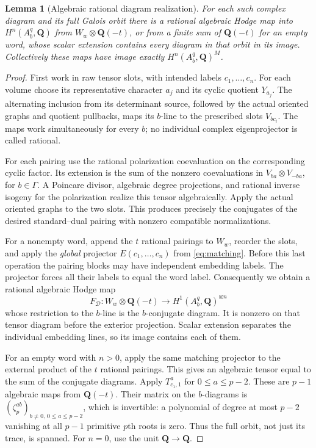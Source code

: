 \documentclass[11pt]{article}
\newtheorem{lemma}[theorem]{Lemma}
\theoremstyle{definition}
\newcommand{\Q}{\mathbf Q}
\begin{document}
\begin{lemma}[Algebraic rational diagram realization]\label{lem:rational}
For each such complex diagram and its full Galois orbit there is a rational
algebraic Hodge map into $H^n(A_b^q,\Q)$ from $W_w\otimes\Q(-t)$,
or from a finite sum of $\Q(-t)$ for an empty word, whose scalar
extension contains every diagram in that orbit in its image. Collectively
these maps have image exactly $H^n(A_b^q,\Q)^M$.
\end{lemma}
\begin{proof}
First work in raw tensor slots, with intended labels $c_1,\ldots,c_n$.
For each volume choose its representative character $a_j$ and its cyclic
quotient $Y_{a_j}$. The alternating inclusion from its determinant source,
followed by the actual oriented graphs and quotient pullbacks, maps its
$b$-line to the prescribed slots $V_{bc_i}$. The maps work simultaneously
for every $b$; no individual complex eigenprojector is called rational.

For each pairing use the rational polarization coevaluation on the
corresponding cyclic factor. Its extension is the sum of the nonzero
coevaluations in $V_{ba}\otimes V_{-ba}$, for $b\in\Gamma$. A
Poincare divisor, algebraic degree projections, and rational inverse
isogeny for the polarization realize this tensor algebraically. Apply the
actual oriented graphs to the two slots. This produces precisely the
conjugates of the desired standard--dual pairing with nonzero compatible
normalizations.

For a nonempty word, append the $t$ rational pairings to $W_w$, reorder
the slots, and apply the \emph{global} projector
$E(c_1,\ldots,c_n)$ from \eqref{eq:matching}. Before this last operation
the pairing blocks may have independent embedding labels. The projector
forces all their labels to equal the word label. Consequently we obtain a
rational algebraic Hodge map
\[
 F_{\mathcal D}:W_w\otimes\Q(-t)
       \longrightarrow H^1(A_b^q,\Q)^{\otimes n}
\]
whose restriction to the $b$-line is the $b$-conjugate diagram. It is
nonzero on that tensor diagram before the exterior projection. Scalar
extension separates the individual embedding lines, so its image contains
each of them.

For an empty word with $n>0$, apply the same matching projector to the
external product of the $t$ rational pairings. This gives an algebraic
tensor equal to the sum of the conjugate diagrams. Apply
$T_{c_1,1}^a$ for $0\leq a\leq p-2$. These are $p-1$ algebraic
maps from $\Q(-t)$. Their matrix on the $b$-diagrams is
$(\zeta_p^{ab})_{b\ne0,\,0\leq a\leq p-2}$, which is invertible:
a polynomial of degree at most $p-2$ vanishing at all $p-1$ primitive
$p$th roots is zero. Thus the full orbit, not just its trace, is spanned.
For $n=0$, use the unit $\Q\to\Q$.


\end{proof}
\end{document}
